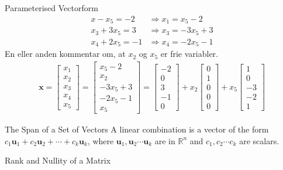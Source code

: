 \begin{example}{Parameterised Vectorform }
	\begin{align*}
		x-x_5 =-2   &\Rightarrow x_1=x_5 -2\\
        x_3 + 3x_5 =3 &\Rightarrow x_3=-3x_5+3\\
        x_4 +2x_5 = -1 &\Rightarrow	x_4=-2x_5-1
	\end{align*}
	En eller anden kommentar om, at $x_2$ og $x_5$ er frie variabler. 
    \begin{align*}
    	\textbf{x}=
        \begin{bmatrix}
       	    x_1\\ x_2 \\ x_3\\ x_4 \\x_5
        \end{bmatrix} =
        \begin{bmatrix}
        	x_5- 2\\ x_2\\ -3x_5 +3\\-2x_5-1\\ x_5 
        \end{bmatrix}=
        \begin{bmatrix}
      	    -2\\ 0 \\ 3 \\-1 \\0
        \end{bmatrix} + x_2
        \begin{bmatrix}
            0 \\ 1 \\ 0 \\ 0 \\ 0 
        \end{bmatrix} + x_5
        \begin{bmatrix}
            1 \\ 0 \\ -3 \\ -2 \\ 1
        \end{bmatrix}
    \end{align*}
\end{example}

\begin{definition} {The Span of a Set of Vectors}
A linear combination is a vector of the form $c_1 \textbf{u}_1 + c_2\textbf{u}_2+ \cdots+ c_k\textbf{u}_k$, where $\textbf{u}_1,\textbf{u}_2 \cdots \textbf{u}_k$ are in $\mathbb{R}^n$ and $c_1, c_2 \cdots c_k$ are scalars. 
\end{definition}

\begin{definition}{Rank and Nullity of a Matrix}

\end{definition}